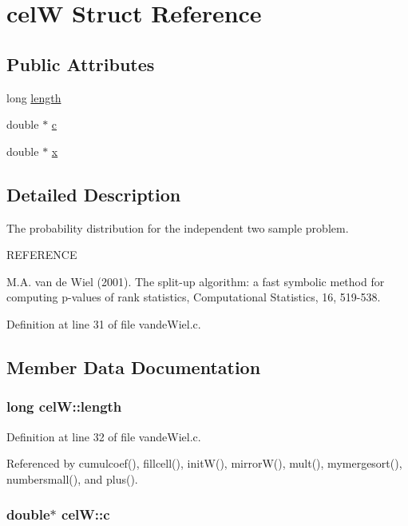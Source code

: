 \hypertarget{structcelW}{
\section{celW Struct Reference}
\label{structcelW}
}
\subsection*{Public Attributes}
\begin{CompactItemize}
\item 
long \hyperlink{structcelW_47b173a5f8c56a051237cac49ddbef4f}{length}
\item 
double $\ast$ \hyperlink{structcelW_f8a631c01b9310cf542171f4df975499}{c}
\item 
double $\ast$ \hyperlink{structcelW_b443b2a7120f170c2c5e8012f4dd86d7}{x}
\end{CompactItemize}


\subsection{Detailed Description}
The probability distribution for the independent two sample problem.

REFERENCE

M.A. van de Wiel (2001). The split-up algorithm: a fast symbolic method for computing p-values of rank statistics, Computational Statistics, 16, 519-538. 

Definition at line 31 of file vandeWiel.c.

\subsection{Member Data Documentation}
\hypertarget{structcelW_47b173a5f8c56a051237cac49ddbef4f}{
\subsubsection[length]{\setlength{\rightskip}{0pt plus 5cm}long {\bf celW::length}}}
\label{structcelW_47b173a5f8c56a051237cac49ddbef4f}




Definition at line 32 of file vandeWiel.c.

Referenced by cumulcoef(), fillcell(), initW(), mirrorW(), mult(), mymergesort(), numbersmall(), and plus().\hypertarget{structcelW_f8a631c01b9310cf542171f4df975499}{
\subsubsection[c]{\setlength{\rightskip}{0pt plus 5cm}double$\ast$ {\bf celW::c}}}
\label{structcelW_f8a631c01b9310cf542171f4df975499}




